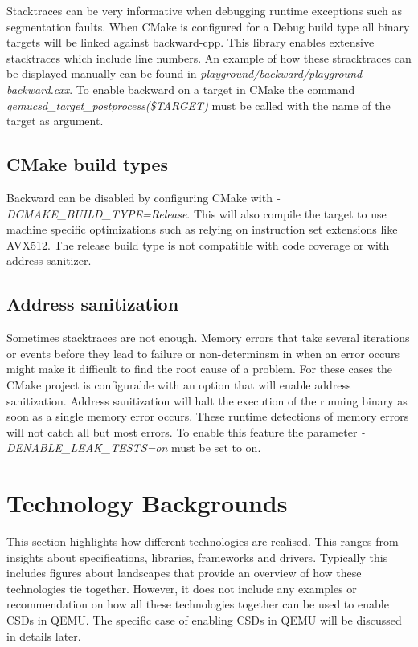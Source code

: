 \documentclass[conference]{IEEEtran}
\begin{document}
Stacktraces can be very informative when debugging runtime exceptions such as
segmentation faults. When CMake is configured for a Debug build type all binary
targets will be linked against backward-cpp. This library enables extensive
stacktraces which include line numbers. An example of how these stracktraces can
be displayed manually can be found in
\textit{playground/backward/playground-backward.cxx}. To enable backward on a
target in CMake the command \textit{qemucsd\_target\_postprocess(\$TARGET)} must
be  called with the name of the target as argument.

\subsection{CMake build types}

Backward can be disabled by configuring CMake with
\textit{-DCMAKE\_BUILD\_TYPE=Release}. This will also compile the target to use
machine specific optimizations such as relying on instruction set extensions
like AVX512. The release build type is not compatible with code coverage or with
address sanitizer.

\subsection{Address sanitization}

Sometimes stacktraces are not enough. Memory errors that take several iterations
or events before they lead to failure or non-determinsm in when an error occurs
might make it difficult to find the root cause of a problem. For these cases the
CMake project is configurable with an option that will enable address
sanitization. Address sanitization will halt the execution of the running binary
as soon as a single memory error occurs. These runtime detections of memory
errors will not catch all but most errors. To enable this feature the parameter
\textit{-DENABLE\_LEAK\_TESTS=on} must be set to on.

\section{Technology Backgrounds}

This section highlights how different technologies are realised. This ranges
from insights about specifications, libraries, frameworks and drivers. Typically
this includes figures about landscapes that provide an overview of how these
technologies tie together. However, it does not include any examples or
recommendation on how all these technologies together can be used to enable
CSDs in QEMU. The specific case of enabling CSDs in QEMU will be discussed in
details later.
\end{document}
